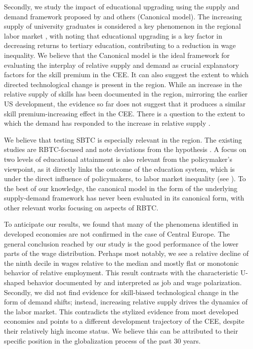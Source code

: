 \documentclass[11pt]{article}
\begin{document}
Secondly, we study the impact of educational upgrading using the supply and demand framework proposed by \cite{katz1992changes} and others (Canonical model). The increasing supply of university graduates is considered a key phenomenon in the regional labor market \citep{arendt2019technical, hardy2018educational}, with \cite{magda2021firms} noting that educational upgrading is a key factor in decreasing returns to tertiary education, contributing to a reduction in wage inequality. We believe that the Canonical model is the ideal framework for evaluating the interplay of relative supply and demand as crucial explanatory factors for the skill premium in the CEE. It can also suggest the extent to which directed technological change is present in the region. While an increase in the relative supply of skills has been documented in the region, mirroring the earlier US development, the evidence so far does not suggest that it produces a similar skill premium-increasing effect in the CEE. There is a question to the extent to which the demand has responded to the increase in relative supply \cite{acemoglu2002directed}.

We believe that testing SBTC is especially relevant in the region. The existing studies are RBTC-focused and note deviations from the hypothesis \citep{arendt2019technical, hardy2018educational}. A focus on two levels of educational attainment is also relevant from the policymaker's viewpoint, as it directly links the outcome of the education system, which is under the direct influence of policymakers, to labor market inequality (see \citep{goldin2010race}). To the best of our knowledge, the canonical model in the form of the underlying supply-demand framework has never been evaluated in its canonical form, with other relevant works focusing on aspects of RBTC.

To anticipate our results, we found that many of the phenomena identified in developed economies are not confirmed in the case of Central Europe. The general conclusion reached by our study is the good performance of the lower parts of the wage distribution. Perhaps most notably, we see a relative decline of the ninth decile in wages relative to the median and mostly flat or monotonic behavior of relative employment. This result contrasts with the characteristic U-shaped behavior documented by \citet{acemoglu2012does} and interpreted as job and wage polarization. Secondly, we did not find evidence for skill-biased technological change in the form of demand shifts; instead, increasing relative supply drives the dynamics of the labor market. This contradicts the stylized evidence from most developed economies and points to a different development trajectory of the CEE, despite their relatively high income status. We believe this can be attributed to their specific position in the globalization process of the past 30 years. %
\end{document}
